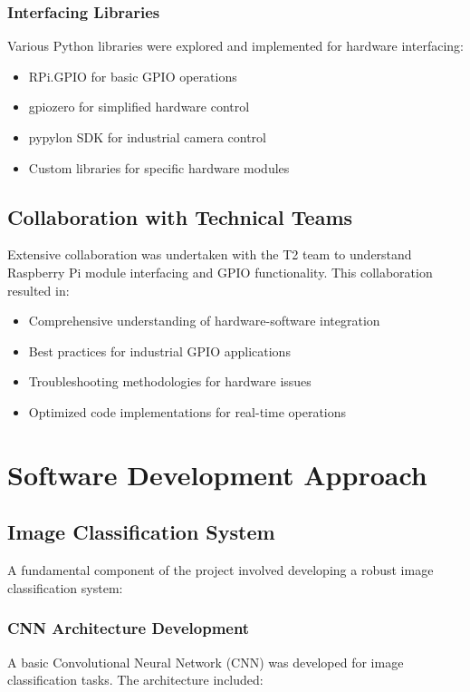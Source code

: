 \documentclass{book}
\begin{document}
\subsubsection{Interfacing Libraries}
\par\noindent Various Python libraries were explored and implemented for hardware interfacing:

\begin{itemize}
\item RPi.GPIO for basic GPIO operations
\item gpiozero for simplified hardware control
\item pypylon SDK for industrial camera control
\item Custom libraries for specific hardware modules
\end{itemize}

\subsection{Collaboration with Technical Teams}
\par\noindent Extensive collaboration was undertaken with the T2 team to understand Raspberry Pi module interfacing and GPIO functionality. This collaboration resulted in:

\begin{itemize}
\item Comprehensive understanding of hardware-software integration
\item Best practices for industrial GPIO applications
\item Troubleshooting methodologies for hardware issues
\item Optimized code implementations for real-time operations
\end{itemize}

\section{Software Development Approach}

\subsection{Image Classification System}
\par\noindent A fundamental component of the project involved developing a robust image classification system:

\subsubsection{CNN Architecture Development}
\par\noindent A basic Convolutional Neural Network (CNN) was developed for image classification tasks. The architecture included:
\end{document}
